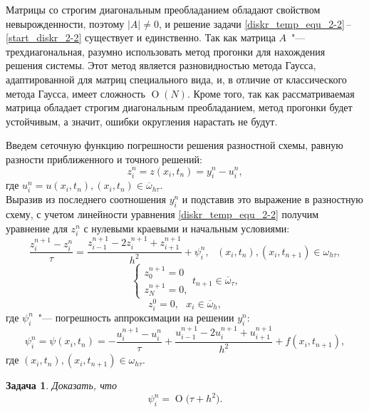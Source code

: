 \documentclass[11pt,a4paper,twoside,listtotoc,bibtotoc]{report}
\numberwithin{equation}{section}
\newtheorem*{problem}{Задача}
\theoremstyle{definition}
\theoremstyle{plain}
\newcommand{\bigO}[1]{\ensuremath{\operatorname{O}\bigl(#1\bigr)}}
\begin{document}
Матрицы со строгим диагональным преобладанием обладают свойством
невырожденности, поэтому $|A|\neq0$, и решение задачи
\eqref{diskr_temp_equ_2-2}\,--\,\eqref{start_diskr_2-2} существует и единственно.
Так как матрица $A$~"--- трехдиагональная, разумно использовать метод прогонки
для нахождения решения системы. Этот метод является разновидностью метода Гаусса,
адаптированной для матриц специального вида, и, в отличие от классического метода
Гаусса, имеет сложность $\operatorname{O}(N)$. Кроме того, так как рассматриваемая матрица
обладает строгим диагональным преобладанием, метод прогонки будет устойчивым, а значит,
ошибки округления нарастать не будут.

Введем сеточную функцию погрешности решения разностной схемы,
равную разности приближенного и точного решений:
%
$$
    z_i^n = z(x_i, t_n) = y_i^n - u_i^n,
$$
%
где $u_i^n = u(x_i, t_n), (x_i, t_n) \in \overline{\omega}_{h \tau}$.\\
Выразив из последнего соотношения $y_i^n$ и подставив это выражение в разностную
схему, с учетом линейности уравнения
\eqref{diskr_temp_equ_2-2} получим уравнение для $z_i^n$ с нулевыми краевыми и начальным
условиями:
%
\begin{equation}
    \label{z_eq_3}
    \dfrac{z_i^{n+1} - z_i^n}{\tau} = \dfrac{z_{i-1}^{n+1} - 2z_i^{n+1} +
    z_{i+1}^{n+1}}{h^2} + \psi_i^n,~~~(x_i, t_n), (x_i, t_{n+1})\in \omega_{h \tau},
\end{equation}
%
\begin{equation}
    \label{z_board_3}
    \begin{cases}
        z_0^{n+1} = 0 \\
        z_N^{n+1} = 0,
    \end{cases}
    t_{n+1}\in \overline{\omega}_{\tau},
\end{equation}
%
\begin{equation}
    \label{z_start_3}
    z_i^0 = 0,~~~x_i\in \overline{\omega}_h,
\end{equation}
%
где $\psi_i^n$~"--- погрешность аппроксимации на решении $y_i^n$:
%
\begin{equation}
%
    \label{approx_temp_1}
    \psi_i^n = \psi(x_i, t_n) =  -\dfrac{u_i^{n+1} - u_i^n}{\tau}
    + \dfrac{u_{i-1}^{n+1} - 2u_i^{n+1} + u_{i+1}^{n+1}}{h^2} + f(x_i, t_{n+1}),
%
\end{equation}
%
где $(x_i, t_n), (x_i, t_{n+1})\in \omega_{h \tau}$.
%
\begin{problem}
%
    Доказать, что
    \begin{equation}
        \label{eq:problemeq}
        \psi_i^n = \bigO{\tau + h^2}.
    \end{equation}
%
\end{problem}
\end{document}
